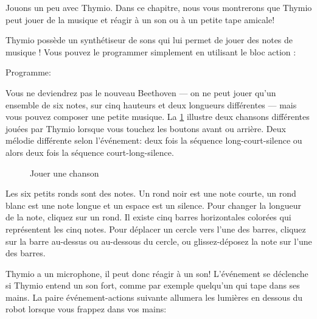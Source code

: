 \label{ch.bells}

Jouons un peu avec Thymio.
Dans ce chapitre, nous vous montrerons que Thymio peut jouer de la musique et réagir à un son ou à un petite tape amicale!


Thymio possède un synthétiseur de sons qui lui permet de jouer des notes de musique !
Vous pouvez le programmer simplement en utilisant le bloc action :

{\raggedleft \hfill Programme: }

Vous ne deviendrez pas le nouveau Beethoven --- on ne peut jouer qu'un ensemble de six notes, sur cinq hauteurs et deux longueurs différentes --- mais vous pouvez composer une petite musique.
La \cref{fig.music} illustre deux chansons différentes jouées par Thymio lorsque vous touchez les boutons avant ou arrière.
Deux mélodie différente selon l'événement: deux fois la séquence long-court-silence ou alors
deux fois la séquence court-long-silence.

\begin{figure}
\begin{center}
\caption{Jouer une chanson}\label{fig.music}
\end{center}
\end{figure}

Les six petits ronds sont des notes.
Un rond noir est une note courte, un rond blanc est une note longue
et un espace est un silence.
Pour changer la longueur de la note, cliquez sur un rond.
Il existe cinq barres horizontales colorées qui représentent
les cinq notes.
Pour déplacer un cercle vers l'une des barres,
cliquez sur la barre au-dessus ou au-dessous du cercle,
ou glissez-déposez la note sur l'une des barres.




Thymio a un microphone, il peut donc réagir à un son! L'événement  se déclenche si Thymio entend un son fort, comme par exemple quelqu'un qui tape dans ses mains.
La paire événement-actions suivante allumera les lumières en dessous du robot lorsque vous frappez dans vos mains: 

